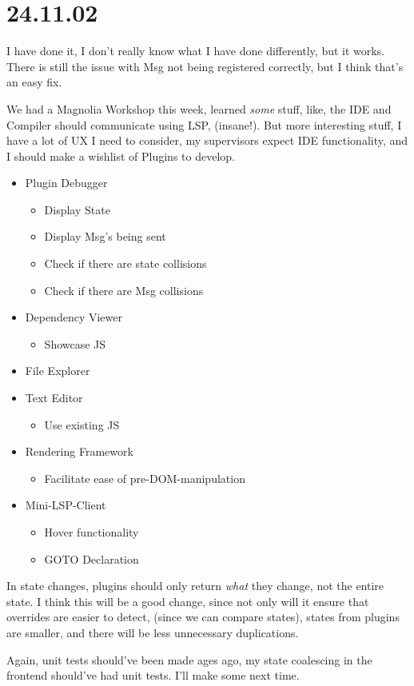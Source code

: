 \section{24.11.02}

I have done it, I don't really know what I have done differently, but it works.
There is still the issue with Msg not being registered correctly, but I think
that's an easy fix.

We had a Magnolia Workshop this week, learned \textit{some} stuff, like, the
IDE and Compiler should communicate using LSP, (insane!). But more interesting
stuff, I have a lot of UX I need to consider, my supervisors expect IDE
functionality, and I should make a wishlist of Plugins to develop.

\begin{itemize}
  \item Plugin Debugger
  \begin{itemize}
    \item Display State
    \item Display Msg's being sent
    \item Check if there are state collisions
    \item Check if there are Msg collisions
  \end{itemize}
  \item Dependency Viewer
  \begin{itemize}
    \item Showcase JS
  \end{itemize}
  \item File Explorer
  \item Text Editor
  \begin{itemize}
    \item Use existing JS
  \end{itemize}
  \item Rendering Framework
  \begin{itemize}
    \item Facilitate ease of pre-DOM-manipulation
  \end{itemize}
  \item Mini-LSP-Client
  \begin{itemize}
    \item Hover functionality
    \item GOTO Declaration
  \end{itemize}
\end{itemize}

In state changes, plugins should only return \textit{what} they change, not the
entire state. I think this will be a good change, since not only will it ensure
that overrides are easier to detect, (since we can compare states), states from
plugins are smaller, and there will be less unnecessary duplications.

Again, unit tests should've been made ages ago, my state coalescing in the
frontend should've had unit tests. I'll make some next time.
